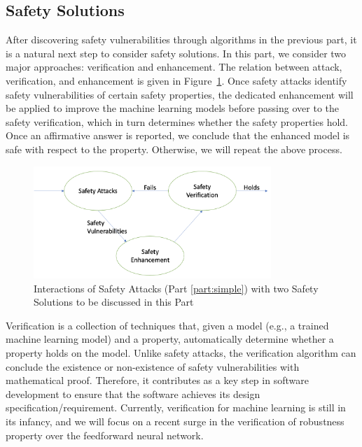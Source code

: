 \begin{partbacktext}
\part{Safety Solutions}\label{chap:verification}

After discovering safety vulnerabilities through algorithms in the previous part, it is a natural next step to consider safety solutions. In this part, we consider two major approaches:  verification and enhancement. The relation between attack, verification, and enhancement is given in Figure~\ref{fig:safetyFramework}. Once safety attacks identify safety vulnerabilities of certain safety properties, the dedicated enhancement will be applied to improve the machine learning models before passing over to the safety verification, which in turn determines whether the safety properties hold. Once an affirmative answer is reported, we conclude that the enhanced model is safe with respect to the property. Otherwise, we will repeat the above process.   

\begin{figure}[!htbp]
    \centering
    \includegraphics[width=0.8\textwidth]{images/robustnessVerification/framework.png}
    \caption{Interactions of Safety Attacks (Part \ref{part:simple}) with two Safety Solutions to be discussed in this Part}
    \label{fig:safetyFramework}
\end{figure}


Verification is a collection of techniques that, given a model (e.g., a trained machine learning model) and a property, automatically determine whether a property holds on the model. Unlike safety attacks, the verification algorithm can conclude the existence or non-existence of safety vulnerabilities with mathematical proof. Therefore, it contributes as a key step in software development to ensure that the software achieves its design specification/requirement. 
%
Currently, verification for machine learning is still in its infancy, and we will focus on a recent surge in the verification of robustness property over the feedforward neural network. 


\end{partbacktext}
